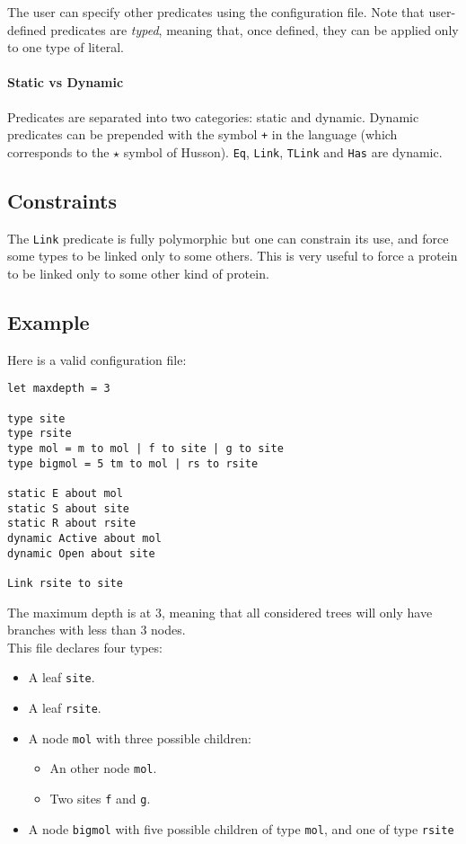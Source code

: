 \documentclass[10pt,a4paper]{article}
\newcommand{\ocaml}{\texttt}
\begin{document}
The user can specify other predicates using the configuration file. Note that user-defined predicates are \emph{typed}, meaning that, once defined, they can be applied only to one type of literal.

\paragraph{Static vs Dynamic}
Predicates are separated into two categories: static and dynamic. Dynamic predicates can be prepended with the symbol \ocaml{+} in the language (which corresponds to the $\star$ symbol of Husson). \ocaml{Eq}, \ocaml{Link}, \ocaml{TLink} and \ocaml{Has} are dynamic.

\subsection{Constraints}
The \ocaml{Link} predicate is fully polymorphic but one can constrain its use, and force some types to be linked only to some others. This is very useful to force a protein to be linked only to some other kind of protein.

\subsection{Example}
Here is a valid configuration file:
\begin{verbatim}
let maxdepth = 3

type site
type rsite
type mol = m to mol | f to site | g to site
type bigmol = 5 tm to mol | rs to rsite

static E about mol
static S about site
static R about rsite
dynamic Active about mol
dynamic Open about site

Link rsite to site
\end{verbatim}
The maximum depth is at 3, meaning that all considered trees will only have branches with less than 3 nodes.\\

This file declares four types:

\begin{itemize}
\item A leaf \ocaml{site}.
\item A leaf \ocaml{rsite}.
\item A node \ocaml{mol} with three possible children:
  \begin{itemize}
  \item An other node \ocaml{mol}.
  \item Two sites \ocaml{f} and \ocaml{g}.
  \end{itemize}
\item A node \ocaml{bigmol} with five possible children of type \ocaml{mol}, and one of type \ocaml{rsite}
\end{itemize}
\end{document}
